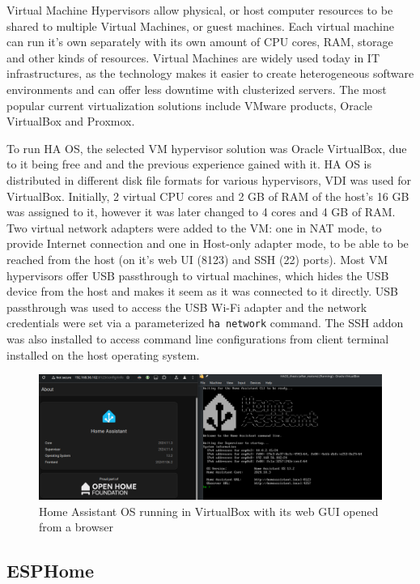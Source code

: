 Virtual Machine Hypervisors allow physical, or host computer resources to be shared to multiple Virtual Machines, or guest machines. \cite{VMwareVM} Each virtual machine can run it's own separately with its own amount of CPU cores, RAM, storage and other kinds of resources. Virtual Machines are widely used today in IT infrastructures, as the technology makes it easier to create heterogeneous software environments and can offer less downtime with clusterized servers. The most popular current virtualization solutions include VMware products, Oracle VirtualBox and Proxmox. \cite{G2freeVM}

To run HA OS, the selected VM hypervisor solution was Oracle VirtualBox, due to it being free and and the previous experience gained with it. HA OS is distributed in different disk file formats for various hypervisors, VDI was used for VirtualBox. %
Initially, 2 virtual CPU cores and 2 GB of RAM of the host's 16 GB was assigned to it, however it was later changed to 4 cores and 4 GB of RAM. Two virtual network adapters were added to the VM: one in NAT mode, to provide Internet connection and one in Host-only adapter mode, to be able to be reached from the host (on it's web UI (8123) and SSH (22) ports). Most VM hypervisors offer USB passthrough to virtual machines, which hides the USB device from the host and makes it seem as it was connected to it directly. USB passthrough was used to access the USB Wi-Fi adapter and the network credentials were set via a parameterized \verb+ha network+ command. The SSH addon was also installed to access command line configurations from client terminal installed on the host operating system.

\begin{figure}[!ht]
  \centering
  \includegraphics[width=150mm, keepaspectratio]{figures/homeassistant_about.png}
  \caption{Home Assistant OS running in VirtualBox with its web GUI opened from a browser}
  \label{fig:HAabout}
\end{figure}

\subsection{ESPHome}

